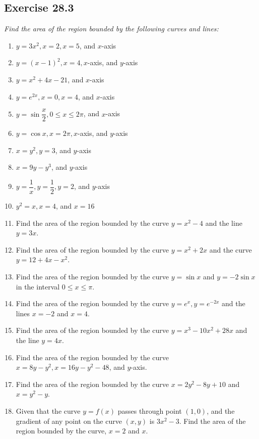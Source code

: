 \documentclass{report}
\begin{document}
\subsection{Exercise 28.3}

\noindent \hspace{1.2em}\textit{Find the area of the region bounded by the following curves and lines:}
\begin{enumerate}
    \item $y=3 x^2, x=2, x=5$, and $x$-axis
    \item $y=(x-1)^2, x=4, x$-axis, and $y$-axis
    \item $y=x^2+4 x-21$, and $x$-axis
    \item $y=e^{2 x}, x=0, x=4$, and $x$-axis
    \item $y=\sin \dfrac{x}{2}, 0 \leq x \leq 2 \pi$, and $x$-axis
    \item $y=\cos x, x=2 \pi, x$-axis, and $y$-axis
    \item $x=y^2, y=3$, and $y$-axis
    \item $x=9 y-y^3$, and $y$-axis
    \item $y=\dfrac{1}{x}, y=\dfrac{1}{2}, y=2$, and $y$-axis
    \item $y^2=x, x=4$, and $x=16$
    \item Find the area of the region bounded by the curve $y=x^2-4$ and the line $y=3
              x$.
    \item Find the area of the region bounded by the curve $y=x^2+2 x$ and the curve
          $y=12+4 x-x^2$.
    \item Find the area of the region bounded by the curve $y=\sin x$ and $y=-2 \sin x$
          in the interval $0 \leq x \leq \pi$.
    \item Find the area of the region bounded by the curve $y=e^x, y=e^{-2 x}$ and the
          lines $x=-2$ and $x=4$.
    \item Find the area of the region bounded by the curve $y=x^3-10 x^2+28 x$ and the
          line $y=4 x$.
    \item Find the area of the region bounded by the curve $x=8 y-y^2, x=16 y-y^2-48$,
          and $y$-axis.
    \item Find the area of the region bounded by the curve $x=2 y^2-8 y+10$ and
          $x=y^2-y$.
    \item Given that the curve $y=f(x)$ passes through point $(1,0)$, and the gradient of
          any point on the curve $(x, y)$ is $3 x^2-3$. Find the area of the region
          bounded by the curve, $x=2$ and $x$.
\end{enumerate}
\end{document}
